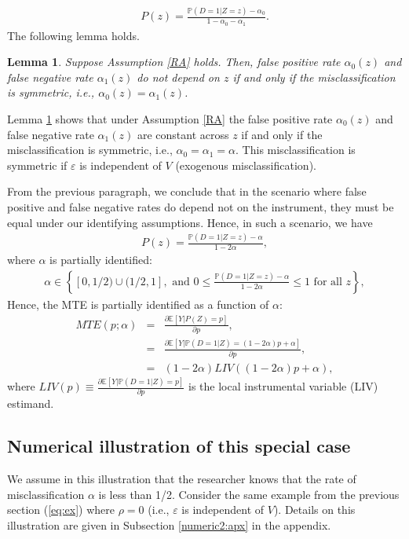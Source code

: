 \documentclass[11pt,reqno]{amsart}
\theoremstyle{plain}
\newtheorem{lemma}{Lemma}
\numberwithin{equation}{section}
\begin{document}
\begin{eqnarray*}
P(z)= \frac{\mathbb P(D=1\vert Z=z)-\alpha_0}{1-\alpha_0-\alpha_1}.
\end{eqnarray*}
The following lemma holds. 
\begin{lemma}\label{symmetry}
Suppose Assumption \ref{RA} holds. Then, false positive rate $\alpha_0(z)$ and false negative rate $\alpha_1(z)$ do not depend on $z$ if and only if the misclassification is symmetric, i.e., $\alpha_0(z)=\alpha_1(z)$. %
\end{lemma}

Lemma \ref{symmetry} shows that under Assumption \ref{RA} the false positive rate $\alpha_0(z)$ and false negative rate $\alpha_1(z)$ are constant across $z$ if and only if the misclassification is symmetric, i.e., $\alpha_0=\alpha_1=\alpha$. This misclassification is symmetric if $\varepsilon$ is independent of $V$ (exogenous misclassification).

From the previous paragraph, we conclude that in the scenario where false positive and false negative rates do depend not on the instrument, they must be equal under our identifying assumptions. Hence, in such a scenario, we have
\begin{eqnarray*}
P(z)= \frac{\mathbb P(D=1\vert Z=z)-\alpha}{1-2\alpha},
\end{eqnarray*}
where $\alpha$ is partially identified:
\begin{eqnarray*}
\alpha \in \left\{[0,1/2)\cup(1/2,1], \text{ and } 0 \leq \frac{\mathbb P(D=1\vert Z=z)-\alpha}{1-2\alpha} \leq 1 \text{ for all } z\right\},
\end{eqnarray*}
Hence, the MTE is partially identified as a function of $\alpha$:
\begin{eqnarray*}
MTE(p ; \alpha)&=& \frac{\partial \mathbb E[Y \vert P(Z)=p] }{\partial p},\\
&=& \frac{\partial \mathbb E\left[Y \vert \mathbb P(D=1\vert Z)=(1-2\alpha)p+\alpha\right] }{\partial p},\\
&=& (1-2\alpha) LIV\left((1-2\alpha)p+\alpha\right),
\end{eqnarray*}
where $LIV(p)\equiv \frac{\partial \mathbb E[Y \vert \mathbb P(D=1\vert Z)=p] }{\partial p}$ is the local instrumental variable (LIV) estimand. 


\subsection*{Numerical illustration of this special case}\label{num}
We assume in this illustration that the researcher knows that the rate of misclassification $\alpha$ is less than 1/2.
Consider the same example from the previous section (\ref{eq:ex}) where $\rho=0$ (i.e., $\varepsilon$ is independent of $V$). 
Details on this illustration are given in Subsection \ref{numeric2:apx} in the appendix.
\end{document}
